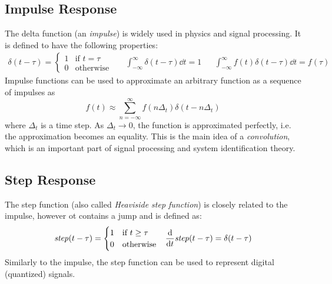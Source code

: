 		\subsection{Impulse Response}
			The delta function (an \emph{impulse}) is widely used in physics and signal processing. It is defined to have the following properties:
			\begin{align*}
				\delta(t - \tau) =
					\begin{cases}
						1 & \text{if } t = \tau \\
						0 & \text{otherwise}
					\end{cases}
				&&
				\int_{-\infty}^{\infty} \! \delta(t - \tau) \dd{t} = 1
				&&
				\int_{-\infty}^{\infty} \! f(t) \delta(t - \tau) \dd{t} = f(\tau)
			\end{align*}
			Impulse functions can be used to approximate an arbitrary function as a sequence of impulses as
			\begin{equation*}
				f(t) \approx \sum_{n = -\infty}^{\infty} f(n\Delta_t) \delta(t - n\Delta_t)
			\end{equation*}
			where \(\Delta_t\) is a time step. As \(\Delta_t \to 0\), the function is approximated perfectly, i.e. the approximation becomes an equality. This is the main idea of a \emph{convolution}, which is an important part of signal processing and system identification theory.

		\subsection{Step Response}
			The step function (also called \emph{Heaviside step function}) is closely related to the impulse, however ot contains a jump and is defined as:
			\begin{align*}
				\mathit{step}(t - \tau) =
					\begin{cases}
						1 & \text{if } t \geq \tau \\
						0 & \text{otherwise}
					\end{cases}
				&&
				\dv{t} \mathit{step}(t - \tau) = \delta(t - \tau)
			\end{align*}
			Similarly to the impulse, the step function can be used to represent digital (quantized) signals.

